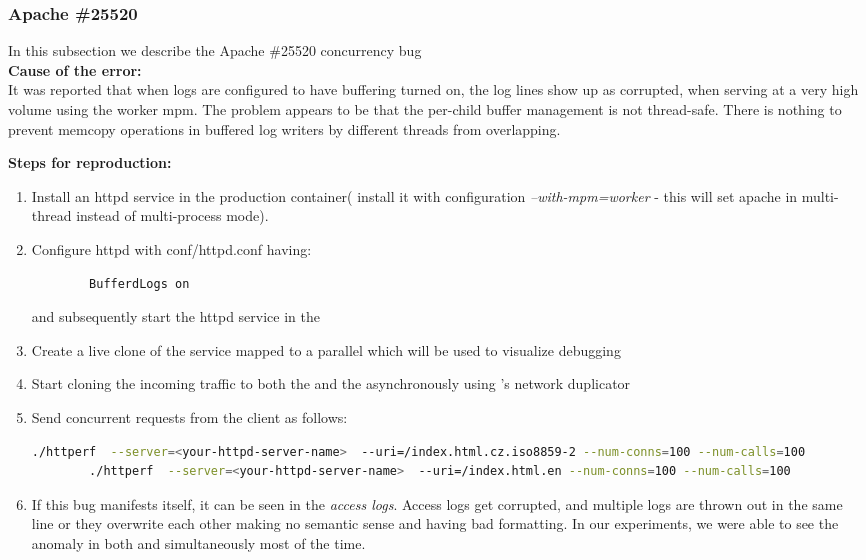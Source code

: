 \subsubsection{Apache \#25520}

In this subsection we describe the Apache \#25520 concurrency bug \\

\noindent \textbf{Cause of the error:} \\

It was reported that when logs are configured to have buffering turned on, the log lines show up as corrupted, when serving at a very high volume using the worker mpm.
The problem appears to be that the per-child buffer management is not thread-safe.
There is nothing to prevent memcopy operations in buffered log writers by different threads from overlapping.
 

\noindent \textbf{Steps for reproduction:} \\

\begin{adjustwidth}{0.5cm}{}
	\begin{enumerate}
		\item Install an httpd service in the production container( install it with configuration \emph{--with-mpm=worker} - this will set apache in multi-thread instead of multi-process mode).
		\item Configure httpd with conf/httpd.conf having:
		
		\begin{lstlisting}
		BufferdLogs on
		\end{lstlisting}
		
		and subsequently start the httpd service in the \productioncontainer
		
		\item Create a live clone of the service mapped to a parallel \debugcontainer which will be used to visualize debugging
		\item Start cloning the incoming traffic to both the \productioncontainer and the \debugcontainer asynchronously using \parikshan's network duplicator
		
		\item Send concurrent requests from the client as follows:
		
		\begin{lstlisting}[language=sh]
		./httperf  --server=<your-httpd-server-name>  --uri=/index.html.cz.iso8859-2 --num-conns=100 --num-calls=100
		./httperf  --server=<your-httpd-server-name>  --uri=/index.html.en --num-conns=100 --num-calls=100
		\end{lstlisting}
		
		\item If this bug manifests itself, it can be seen in the \emph{access logs}. Access logs get corrupted, and multiple logs are thrown out in the same line or they overwrite each other making no semantic sense and having bad formatting. In our experiments, we were able to see the anomaly in both \productioncontainer and \debugcontainer simultaneously most of the time.
		
	\end{enumerate}
\end{adjustwidth}

